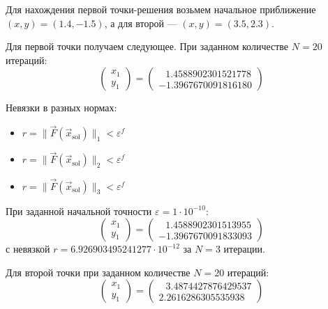 		Для нахождения первой точки-решения возьмем начальное приближение $(x, y) = (1.4, -1.5)$, а для второй --- $(x, y) = (3.5, 2.3)$.
	
		
		Для первой точки получаем следующее. При заданном количестве $N = 20$ итераций:
		\begin{equation*}
			\begin{pmatrix}
				x_1 \\
				y_1
			\end{pmatrix} = 
			\begin{pmatrix}
				\;\;\, 1.4588902301521778 \\
				-1.3967670091816180
			\end{pmatrix}
		\end{equation*}
	
		Невязки в разных нормах:
		\begin{itemize}
			\item $r = \|\vec{F}(\vec{x}_\text{sol})\|_{1} < \varepsilon^f$
			
			\item $r = \|\vec{F}(\vec{x}_\text{sol})\|_{2} < \varepsilon^f$
			
			\item $r = \|\vec{F}(\vec{x}_\text{sol})\|_{3} < \varepsilon^f$
		\end{itemize}
	
		При заданной начальной точности $\varepsilon = 1 \cdot 10^{-10}$:
		\begin{equation*}
			\begin{pmatrix}
				x_1 \\
				y_1
			\end{pmatrix} = 
			\begin{pmatrix}
				\;\;\, 1.4588902301513955 \\
				-1.3967670091833093
			\end{pmatrix}
		\end{equation*}
		\noindent с невязкой $r = 6.926903495241277 \cdot 10^{-12}$ за $N = 3$ итерации.
		
		Для второй точки при заданном количестве $N = 20$ итераций:
		\begin{equation*}
			\begin{pmatrix}
				x_1 \\
				y_1
			\end{pmatrix} = 
			\begin{pmatrix}
				\;\;\, 3.4874427876429537 \\
				2.2616286305535938
			\end{pmatrix}
		\end{equation*}
		
